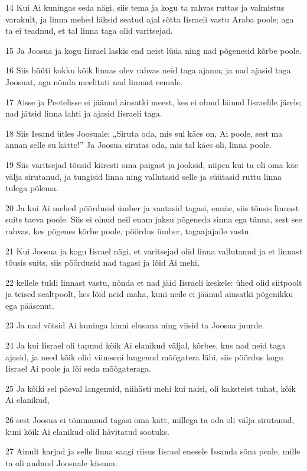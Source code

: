 \par 14 Kui Ai kuningas seda nägi, siis tema ja kogu ta rahvas ruttas ja valmistus varakult, ja linna mehed läksid seatud ajal sõtta Iisraeli vastu Araba poole; aga ta ei teadnud, et tal linna taga olid varitsejad.
\par 15 Ja Joosua ja kogu Iisrael laskis end neist lüüa ning nad põgenesid kõrbe poole.
\par 16 Siis hüüti kokku kõik linnas olev rahvas neid taga ajama; ja nad ajasid taga Joosuat, aga nõnda meelitati nad linnast eemale.
\par 17 Aisse ja Peetelisse ei jäänud ainsatki meest, kes ei olnud läinud Iisraelile järele; nad jätsid linna lahti ja ajasid Iisraeli taga.
\par 18 Siis Issand ütles Joosuale: „Siruta oda, mis sul käes on, Ai poole, sest ma annan selle su kätte!” Ja Joosua sirutas oda, mis tal käes oli, linna poole.
\par 19 Siis varitsejad tõusid kiiresti oma paigast ja jooksid, niipea kui ta oli oma käe välja sirutanud, ja tungisid linna ning vallutasid selle ja süütasid ruttu linna tulega põlema.
\par 20 Ja kui Ai mehed pöördusid ümber ja vaatasid tagasi, ennäe, siis tõusis linnast suits taeva poole. Siis ei olnud neil enam jaksu põgeneda sinna ega tänna, sest see rahvas, kes põgenes kõrbe poole, pöördus ümber, tagaajajaile vastu.
\par 21 Kui Joosua ja kogu Iisrael nägi, et varitsejad olid linna vallutanud ja et linnast tõusis suits, siis pöördusid nad tagasi ja lõid Ai mehi,
\par 22 kellele tuldi linnast vastu, nõnda et nad jäid Iisraeli keskele: ühed olid siitpoolt ja teised sealtpoolt, kes lõid neid maha, kuni neile ei jäänud ainsatki põgenikku ega pääsenut.
\par 23 Ja nad võtsid Ai kuninga kinni elusana ning viisid ta Joosua juurde.
\par 24 Ja kui Iisrael oli tapnud kõik Ai elanikud väljal, kõrbes, kus nad neid taga ajasid, ja need kõik olid viimseni langenud mõõgatera läbi, siis pöördus kogu Iisrael Ai poole ja lõi seda mõõgateraga.
\par 25 Ja kõiki sel päeval langenuid, niihästi mehi kui naisi, oli kaksteist tuhat, kõik Ai elanikud,
\par 26 sest Joosua ei tõmmanud tagasi oma kätt, millega ta oda oli välja sirutanud, kuni kõik Ai elanikud olid hävitatud sootuks.
\par 27 Ainult karjad ja selle linna saagi riisus Iisrael enesele Issanda sõna peale, mille ta oli andnud Joosuale käsuna.
